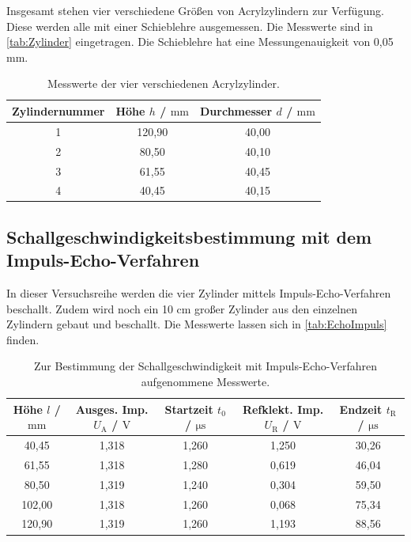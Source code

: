  Insgesamt stehen vier verschiedene Größen von Acrylzylindern zur Verfügung. Diese werden alle mit einer Schieblehre
  ausgemessen. Die Messwerte sind in \autoref{tab:Zylinder} eingetragen. Die Schieblehre hat eine Messungenauigkeit von
  0,05 mm.

  \begin{table}
    \centering
    \caption{Messwerte der vier verschiedenen Acrylzylinder.}
    \label{tab:Zylinder}
    \begin{tabular}{c | c c}
      Zylindernummer & Höhe $h$ / $\si{\milli\meter}$ & Durchmesser $d$ / $\si{\milli\meter}$ \\
        \midrule
          1 & 120,90 & 40,00 \\
          2 & 80,50  & 40,10 \\
          3 & 61,55  & 40,45 \\
          4 & 40,45  & 40,15 \\
        \bottomrule
      \end{tabular}
  \end{table}

\subsection{Schallgeschwindigkeitsbestimmung mit dem Impuls-Echo-Verfahren}

  In dieser Versuchsreihe werden die vier Zylinder mittels Impuls-Echo-Verfahren beschallt. Zudem wird noch
  ein 10 cm großer Zylinder aus den einzelnen Zylindern gebaut und beschallt. Die Messwerte lassen sich in 
  \autoref{tab:EchoImpuls} finden.

  \begin{table}
    \centering
    \caption{Zur Bestimmung der Schallgeschwindigkeit mit Impuls-Echo-Verfahren aufgenommene Messwerte.}
    \label{tab:EchoImpuls}
    \begin{tabular}{c | c c c c}
      Höhe $l$ / $\si{\milli\meter}$ & Ausges. Imp. $U_{\mathrm{A}}$ / $\si{\volt}$ &  Startzeit $t_0$ / $\si{\micro\second}$ & Refklekt. Imp. $U_{\mathrm{R}}$ / $\si{\volt}$ & Endzeit $t_{\mathrm{R}}$ / $\si{\micro\second}$ \\
        \midrule
          40,45 & 1,318 & 1,260 & 1,250 & 30,26 \\
          61,55 & 1,318 & 1,280 & 0,619 & 46,04 \\
          80,50 & 1,319 & 1,240 & 0,304 & 59,50 \\
          102,00 & 1,318 & 1,260 & 0,068 & 75,34 \\
          120,90 & 1,319 & 1,260 & 1,193 & 88,56 \\
        \bottomrule
      \end{tabular}
  \end{table}

